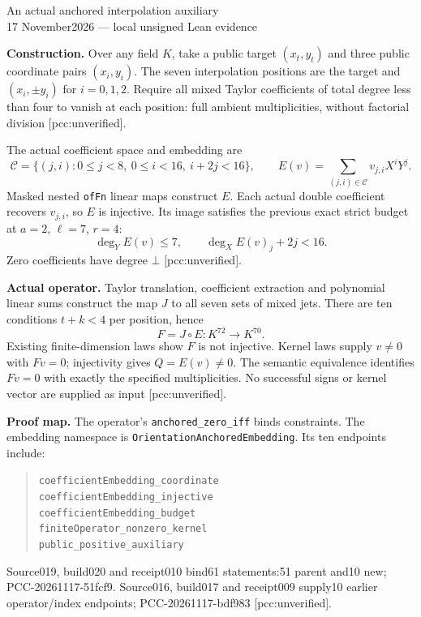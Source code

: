 \documentclass[10pt]{article}
\begin{document}
\begin{center}{\Large An actual anchored interpolation auxiliary}\\[4pt]
17 November2026 --- local unsigned Lean evidence\end{center}
\textbf{Construction.} Over any field $K$, take a public target $(x_t,y_t)$
and three public coordinate pairs $(x_i,y_i)$. The seven interpolation
positions are the target and $(x_i,\pm y_i)$ for $i=0,1,2$.
Require all mixed Taylor coefficients of total degree less than four
to vanish at each position: full ambient multiplicities,
without factorial division [pcc:unverified].

The actual coefficient space and embedding are
\[
 \mathcal C=\{(j,i):0\le j<8,\ 0\le i<16,\ i+2j<16\},\qquad
 E(v)=\sum_{(j,i)\in\mathcal C}v_{j,i}X^iY^j.
\]
Masked nested \texttt{ofFn} linear maps construct $E$.
Each actual double coefficient recovers $v_{j,i}$, so $E$ is injective.
Its image satisfies the previous exact strict budget at
$a=2$, $\ell=7$, $r=4$:
\[
 \deg_Y E(v)\le7,\qquad \deg_X E(v)_j+2j<16.
\]
Zero coefficients have degree $\bot$ [pcc:unverified].

\textbf{Actual operator.}
Taylor translation, coefficient extraction and polynomial linear sums
construct the map $J$ to all seven sets of mixed jets.
There are ten conditions $t+k<4$ per position, hence
\[
 F=J\circ E:K^{72}\longrightarrow K^{70}.
\]
Existing finite-dimension laws show $F$ is not injective.
Kernel laws supply $v\ne0$ with $Fv=0$; injectivity gives $Q=E(v)\ne0$.
The semantic equivalence identifies $Fv=0$ with exactly the specified
multiplicities. No successful signs or kernel vector are supplied as input
[pcc:unverified].

\textbf{Proof map.} The operator's \texttt{anchored\_zero\_iff} binds constraints.
The embedding namespace is \texttt{OrientationAnchoredEmbedding}.
Its ten endpoints include:
\begin{quote}\small
\texttt{coefficientEmbedding\_coordinate}\\
\texttt{coefficientEmbedding\_injective}\\
\texttt{coefficientEmbedding\_budget}\\
\texttt{finiteOperator\_nonzero\_kernel}\\
\texttt{public\_positive\_auxiliary}
\end{quote}
Source019, build020 and receipt010 bind61 statements:51 parent and10 new;
PCC-20261117-51fcf9. Source016, build017 and receipt009 supply10 earlier
operator/index endpoints; PCC-20261117-bdf983 [pcc:unverified].
\end{document}

